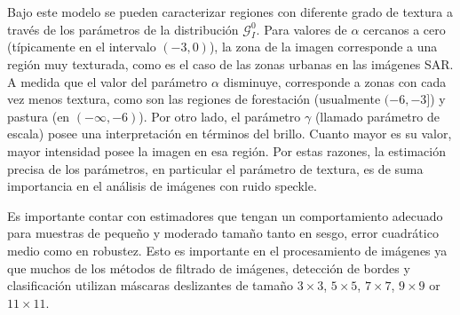 \documentclass[11pt]{article}
\begin{document}
Bajo este modelo se pueden caracterizar regiones con diferente grado de textura a través de los parámetros de la distribución $\mathcal{G}_I^{0}$. Para valores de $\alpha$ cercanos a cero (típicamente en el intervalo $(-3,0)$), la zona de la imagen corresponde a una región muy texturada, como es el caso de las zonas urbanas en las imágenes SAR. A medida que el valor del parámetro $\alpha$ disminuye, corresponde a zonas con cada vez menos textura, como son las regiones de forestación (usualmente $(-6,-3]$) y pastura (en $(-\infty,-6)$). Por otro lado, el parámetro $\gamma$ (llamado parámetro de escala) posee una interpretación en términos del brillo. Cuanto mayor es su valor, mayor intensidad posee la imagen en esa región. Por estas razones, la estimación precisa de los parámetros, en particular el parámetro de textura, es de suma importancia en el análisis de imágenes con ruido speckle. 



Es importante contar con estimadores que tengan un comportamiento adecuado para muestras de pequeño y moderado tamaño tanto en sesgo, error cuadrático medio como en robustez. Esto es importante en el procesamiento de imágenes ya que muchos de los métodos de filtrado de imágenes, detección de bordes y clasificación utilizan máscaras deslizantes de tamaño $3 \times 3$,  $5 \times 5$, $7 \times 7$, $9 \times 9$ or  $11 \times 11$. 
\end{document}
